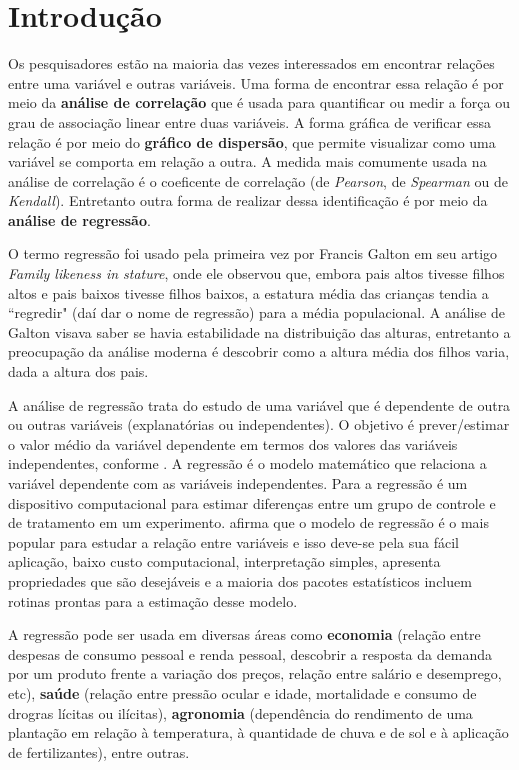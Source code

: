 \chapter{Introdução}
\label{ch:introducao}

Os pesquisadores estão na maioria das vezes interessados em encontrar relações entre uma variável e outras variáveis. Uma forma de encontrar essa relação é por meio da \textbf{análise de correlação} que é usada para quantificar ou medir a força ou grau de associação linear entre duas variáveis. A forma gráfica de verificar essa relação é por meio do \textbf{gráfico de dispersão}, que permite visualizar como uma variável se comporta em relação a outra. A medida mais comumente usada na análise de correlação é o coeficente de correlação (de \textit{Pearson}, de \textit{Spearman} ou de \textit{Kendall}). Entretanto outra forma de realizar dessa identificação é por meio da \textbf{análise de regressão}. 

O termo regressão foi usado pela primeira vez por Francis Galton em seu artigo \textit{Family likeness in stature}, onde ele observou que, embora pais altos tivesse filhos altos e pais baixos tivesse filhos baixos, a estatura média das crianças tendia a ``regredir" (daí dar o nome de regressão) para a média populacional. A análise de Galton visava saber se havia estabilidade na distribuição das alturas, entretanto a preocupação da análise moderna é descobrir como a altura média dos filhos varia, dada a altura dos pais. 

A análise de regressão trata do estudo de uma variável  que é dependente de outra ou outras variáveis (explanatórias ou independentes). O objetivo é prever/estimar o valor médio da variável dependente em termos dos valores das variáveis independentes, conforme . A regressão é o modelo matemático que relaciona a variável dependente com as variáveis independentes. Para  a regressão é um dispositivo computacional para estimar diferenças entre um grupo de controle e de tratamento em um experimento.  afirma que o modelo de regressão é o mais popular para estudar a relação entre variáveis e isso deve-se pela sua fácil aplicação, baixo custo computacional, interpretação simples, apresenta propriedades que são desejáveis e a maioria dos pacotes estatísticos incluem rotinas prontas para a estimação desse modelo.

A regressão pode ser usada em diversas áreas como \textbf{economia} (relação entre despesas de consumo pessoal e renda pessoal, descobrir a resposta da demanda por um produto frente a variação dos preços, relação entre salário e desemprego, etc), \textbf{saúde} (relação entre pressão ocular e idade, mortalidade e consumo de drogras lícitas ou ilícitas), \textbf{agronomia} (dependência do rendimento de uma plantação em relação à temperatura, à quantidade de chuva e de sol e à aplicação de fertilizantes), entre outras.

